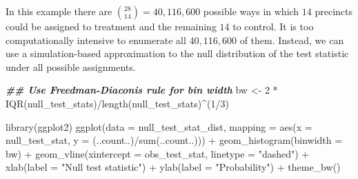 \documentclass[
  12pt,
  leqno]{article}
\newenvironment{Shaded}{\begin{snugshade}}{\end{snugshade}}
\newcommand{\AttributeTok}[1]{\textcolor[rgb]{0.77,0.63,0.00}{#1}}
\newcommand{\DecValTok}[1]{\textcolor[rgb]{0.00,0.00,0.81}{#1}}
\newcommand{\DocumentationTok}[1]{\textcolor[rgb]{0.56,0.35,0.01}{\textbf{\textit{#1}}}}
\newcommand{\FunctionTok}[1]{\textcolor[rgb]{0.00,0.00,0.00}{#1}}
\newcommand{\NormalTok}[1]{#1}
\newcommand{\OtherTok}[1]{\textcolor[rgb]{0.56,0.35,0.01}{#1}}
\newcommand{\SpecialCharTok}[1]{\textcolor[rgb]{0.00,0.00,0.00}{#1}}
\newcommand{\StringTok}[1]{\textcolor[rgb]{0.31,0.60,0.02}{#1}}
\DeclareMathOperator{\1}{\mathbbm{1}}
\begin{document}
\normalsize

In this example there are \(\binom{28}{14} = 40,116,600\) possible ways
in which \(14\) precincts could be assigned to treatment and the
remaining \(14\) to control. It is too computationally intensive to
enumerate all \(40,116,600\) of them. Instead, we can use a
simulation-based approximation to the null distribution of the test
statistic under all possible assignments.

\scriptsize

\begin{Shaded}
\end{Shaded}

\normalsize

\scriptsize

\begin{Shaded}
\begin{Highlighting}[]
\DocumentationTok{\#\# Use Freedman{-}Diaconis rule for bin width}
\NormalTok{bw }\OtherTok{\textless{}{-}} \DecValTok{2} \SpecialCharTok{*} \FunctionTok{IQR}\NormalTok{(null\_test\_stats)}\SpecialCharTok{/}\FunctionTok{length}\NormalTok{(null\_test\_stats)}\SpecialCharTok{\^{}}\NormalTok{(}\DecValTok{1}\SpecialCharTok{/}\DecValTok{3}\NormalTok{)}

\FunctionTok{library}\NormalTok{(ggplot2)}
\FunctionTok{ggplot}\NormalTok{(}\AttributeTok{data =}\NormalTok{ null\_test\_stat\_dist, }\AttributeTok{mapping =} \FunctionTok{aes}\NormalTok{(}\AttributeTok{x =}\NormalTok{ null\_test\_stat, }\AttributeTok{y =}\NormalTok{ (..count..)}\SpecialCharTok{/}\FunctionTok{sum}\NormalTok{(..count..))) }\SpecialCharTok{+}
    \FunctionTok{geom\_histogram}\NormalTok{(}\AttributeTok{binwidth =}\NormalTok{ bw) }\SpecialCharTok{+} \FunctionTok{geom\_vline}\NormalTok{(}\AttributeTok{xintercept =}\NormalTok{ obs\_test\_stat, }\AttributeTok{linetype =} \StringTok{"dashed"}\NormalTok{) }\SpecialCharTok{+}
    \FunctionTok{xlab}\NormalTok{(}\AttributeTok{label =} \StringTok{"Null test statistic"}\NormalTok{) }\SpecialCharTok{+} \FunctionTok{ylab}\NormalTok{(}\AttributeTok{label =} \StringTok{"Probability"}\NormalTok{) }\SpecialCharTok{+} \FunctionTok{theme\_bw}\NormalTok{()}
\end{Highlighting}
\end{Shaded}
\end{document}
